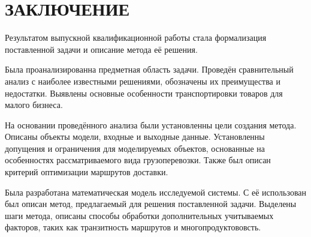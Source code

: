 \section*{ЗАКЛЮЧЕНИЕ}
	Результатом выпускной квалификационной работы стала формализация поставленной задачи и описание метода её решения.
	
	Была проанализированна предметная область задачи. Проведён сравнительный анализ с наиболее известными решениями, обозначены их преимущества и недостатки. Выявлены основные особенности транспортировки товаров для малого бизнеса.
	
	На основании проведённого анализа были установленны цели создания метода. Описаны объекты модели, входные и выходные данные. Установленны допущения и ограничения для моделируемых объектов, основанные на особенностях рассматриваемого вида грузоперевозки. Также был описан критерий оптимизации маршрутов доставки.
	
	Была разработана математическая модель исследуемой системы. С её использован был описан метод, предлагаемый для решения поставленной задачи. Выделены шаги метода, описаны способы обработки дополнительных учитываемых факторов, таких как транзитность маршрутов и многопродуктововсть.
\pagebreak